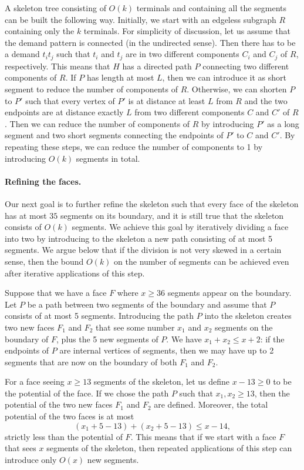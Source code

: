   A skeleton tree consisting of $O(k)$ terminals and containing all the segments can be built the following way. Initially, we start with an edgeless subgraph $R$ containing only the $k$ terminals. For simplicity of discussion, let us assume that the demand pattern is connected (in the undirected sense). Then there has to be a demand $t_it_j$ such that $t_i$ and $t_j$ are in two different components $C_i$ and $C_j$ of $R$, respectively. This means that $H$ has a directed path $P$ connecting two different components of $R$. If $P$ has length at most $L$, then we can introduce it as short segment to reduce the number of components of $R$. Otherwise, we can shorten $P$ to $P'$ such that every vertex of $P'$ is at distance at least $L$ from $R$ and the two endpoints are at distance exactly $L$ from two different components $C$ and $C'$ of $R$. Then we can reduce the number of components of $R$ by introducing $P'$ as a long segment and two short segments connecting the endpoints of $P'$ to $C$ and $C'$. By repeating these steps, we can reduce the number of components to 1 by introducing $O(k)$ segments in total.  

  \paragraph{Refining the faces.} Our next goal is to further refine the skeleton such that every face of the skeleton has at most $35$ segments on its boundary, and it is still true that the skeleton consists of $O(k)$ segments. We achieve this goal by iteratively dividing a face into two by introducing to the skeleton a new path consisting of at most 5 segments. We argue below that if the division is not very skewed in a certain sense, then the bound $O(k)$ on the number of segments can be achieved even after iterative applications of this step.

Suppose that we have a face $F$ where $x\ge 36$ segments appear on the boundary. Let $P$ be a path between two segments of the boundary and assume that $P$ consists of at most 5 segments. Introducing the path $P$ into the skeleton creates two new faces $F_1$ and $F_2$ that see some number $x_1$ and $x_2$ segments on the boundary of $F$, plus the 5 new segments of $P$. We have $x_1+x_2\le x+2$: if the endpoints of $P$ are internal vertices of segments, then we may have up to 2 segments that are now on the boundary of both $F_1$ and $F_2$.

For a face seeing $x\ge 13$ segments of the skeleton, let us define $x-13\ge 0$ to be the potential of the face. If we chose the path $P$ such that $x_1,x_2\ge 13$, then the potential of the two new faces $F_1$ and $F_2$ are defined. Moreover, the total potential of the two faces is at most
\[
  (x_1+5-13)+(x_2+5-13)\le x-14,
\]
strictly less than the potential of $F$. This means that if we start with a face $F$ that sees $x$ segments of the skeleton, then repeated applications of this step can introduce only $O(x)$ new segments.

